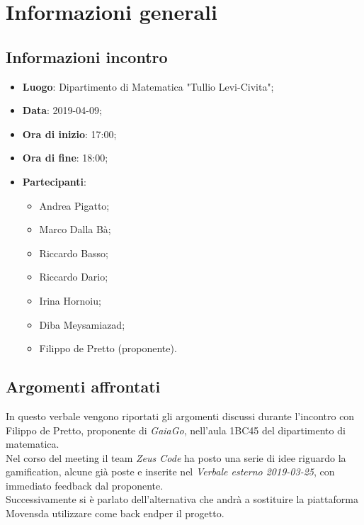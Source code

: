 \section{Informazioni generali}

\subsection{Informazioni incontro}
\begin{itemize}
\item \textbf{Luogo}: Dipartimento di Matematica "Tullio Levi-Civita";
\item \textbf{Data}: 2019-04-09;
\item \textbf{Ora di inizio}: 17:00;
\item \textbf{Ora di fine}: 18:00;
\item \textbf{Partecipanti}: 
\begin{itemize}
	\item Andrea Pigatto;
	\item Marco Dalla Bà;
	\item Riccardo Basso;
	\item Riccardo Dario;
	\item Irina Hornoiu;
	\item Diba Meysamiazad;
	\item Filippo de Pretto (proponente).
\end{itemize}
\end{itemize}

\subsection{Argomenti affrontati}
In questo verbale vengono riportati gli argomenti discussi durante l'incontro con Filippo de Pretto, proponente di \textit{GaiaGo}, nell'aula 1BC45 del dipartimento di matematica.\\
Nel corso del meeting il team \textit{Zeus Code} ha posto una serie di idee riguardo la gamification\glo, alcune già poste e inserite nel \textit{Verbale esterno 2019-03-25}, con immediato feedback dal proponente. \\
Successivamente si è parlato dell'alternativa che andrà a sostituire la piattaforma Movens\glosp da utilizzare come back end\glosp per il progetto.
